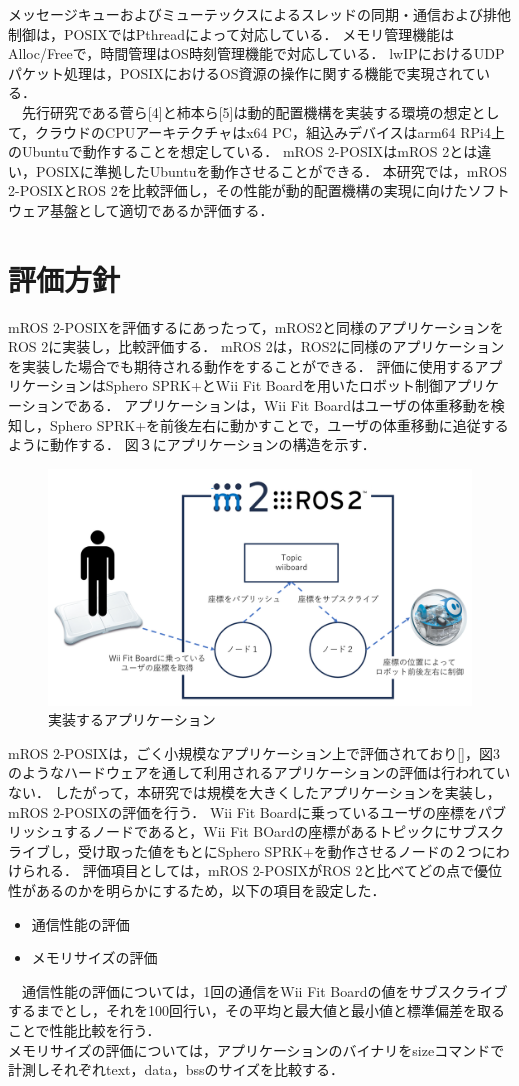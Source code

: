 \documentclass[11pt]{ujarticle}
\begin{document}
メッセージキューおよびミューテックスによるスレッドの同期・通信および排他制御は，POSIXではPthreadによって対応している．
メモリ管理機能はAlloc/Freeで，時間管理はOS時刻管理機能で対応している．
lwIPにおけるUDPパケット処理は，POSIXにおけるOS資源の操作に関する機能で実現されている．
\\　先行研究である菅ら[4]と柿本ら[5]は動的配置機構を実装する環境の想定として，クラウドのCPUアーキテクチャはx64 PC，組込みデバイスはarm64 RPi4上のUbuntuで動作することを想定している．
mROS 2-POSIXはmROS 2とは違い，POSIXに準拠したUbuntuを動作させることができる．
本研究では，mROS 2-POSIXとROS 2を比較評価し，その性能が動的配置機構の実現に向けたソフトウェア基盤として適切であるか評価する． 

\section{評価方針}
mROS 2-POSIXを評価するにあったって，mROS2と同様のアプリケーションをROS 2に実装し，比較評価する．
mROS 2は，ROS2に同様のアプリケーションを実装した場合でも期待される動作をすることができる．
評価に使用するアプリケーションはSphero SPRK+とWii Fit Boardを用いたロボット制御アプリケーションである．
アプリケーションは，Wii Fit Boardはユーザの体重移動を検知し，Sphero SPRK+を前後左右に動かすことで，ユーザの体重移動に追従するように動作する．
図３にアプリケーションの構造を示す．
\begin{figure}[t]
	\centering
	\includegraphics[width=0.65\linewidth]{./src/fig3_application_structure.png}
	\caption{実装するアプリケーション}
  \label{fig:arch}
\end{figure}
mROS 2-POSIXは，ごく小規模なアプリケーション上で評価されており[]，図3のようなハードウェアを通して利用されるアプリケーションの評価は行われていない．
したがって，本研究では規模を大きくしたアプリケーションを実装し，mROS 2-POSIXの評価を行う．
Wii Fit Boardに乗っているユーザの座標をパブリッシュするノードであると，Wii Fit BOardの座標があるトピックにサブスクライブし，受け取った値をもとにSphero SPRK+を動作させるノードの２つにわけられる．
評価項目としては，mROS 2-POSIXがROS 2と比べてどの点で優位性があるのかを明らかにするため，以下の項目を設定した．
\begin{itemize}
	\item 通信性能の評価
	\item メモリサイズの評価
\end{itemize}
　通信性能の評価については，1回の通信をWii Fit Boardの値をサブスクライブするまでとし，それを100回行い，その平均と最大値と最小値と標準偏差を取ることで性能比較を行う．
\\メモリサイズの評価については，アプリケーションのバイナリをsizeコマンドで計測しそれぞれtext，data，bssのサイズを比較する．
\end{document}
